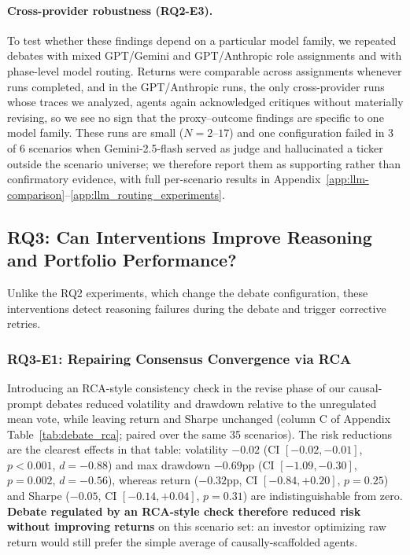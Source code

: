 \documentclass{article}
\begin{document}
\paragraph{Cross-provider robustness (RQ2-E3).}
To test whether these findings depend on a particular model family, we repeated
debates with mixed GPT/Gemini and GPT/Anthropic role assignments and with
phase-level model routing. Returns were comparable across assignments whenever runs
completed, and in the GPT/Anthropic runs, the only cross-provider runs whose traces we
analyzed, agents again acknowledged critiques without materially revising, so we see
no sign that the proxy--outcome findings are specific to one model family. These runs are small
($N{=}2$--$17$) and one configuration failed in 3 of 6 scenarios when Gemini-2.5-flash
served as judge and hallucinated a ticker outside the scenario universe; we therefore
report them as supporting rather than confirmatory evidence, with full per-scenario
results in Appendix~\ref{app:llm-comparison}--\ref{app:llm_routing_experiments}.


\subsection{RQ3: Can Interventions Improve Reasoning and Portfolio Performance?}
\vspace{-0.2cm}
Unlike the RQ2 experiments, which change the debate configuration, these interventions detect reasoning failures during the debate and trigger corrective retries.


\vspace{-0.2cm}
\subsubsection{RQ3-E1: Repairing Consensus Convergence via RCA}
\vspace{-0.2cm}
Introducing an RCA-style consistency check in the revise phase of our causal-prompt debates reduced volatility and drawdown relative to the unregulated mean vote, while leaving return and Sharpe unchanged (column C of Appendix Table~\ref{tab:debate_rca}; paired over the same 35 scenarios). The risk reductions are the clearest effects in that table: volatility $-0.02$ (CI $[-0.02,-0.01]$, $p{<}0.001$, $d{=}{-}0.88$) and max drawdown $-0.69$pp (CI $[-1.09,-0.30]$, $p{=}0.002$, $d{=}{-}0.56$), whereas return ($-0.32$pp, CI $[-0.84,+0.20]$, $p{=}0.25$) and Sharpe ($-0.05$, CI $[-0.14,+0.04]$, $p{=}0.31$) are indistinguishable from zero. \textbf{Debate regulated by an RCA-style check therefore reduced risk without improving returns} on this scenario set: an investor optimizing raw return would still prefer the simple average of causally-scaffolded agents. 
\end{document}
